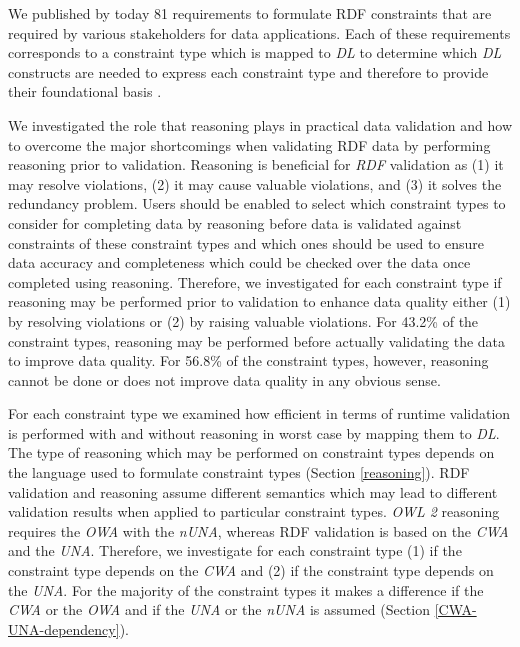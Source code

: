 \documentclass{acm_proc_article-sp}
\begin{document}
We published by today 81 requirements to formulate RDF constraints that are required by various stakeholders for data applications.
Each of these requirements corresponds to a constraint type which is mapped to \emph{DL}
to determine which \emph{DL} constructs are needed to express each constraint type
and therefore to provide their foundational basis \cite{BoschNolleAcarEckert2015}.

We investigated the role that reasoning plays in practical data validation and 
how to overcome the major shortcomings when validating RDF data by performing reasoning prior to validation.
Reasoning is beneficial for \emph{RDF} validation as 
(1) it may resolve violations, 
(2) it may cause valuable violations, and 
(3) it solves the redundancy problem.
Users should be enabled to select which constraint types to consider for completing data by reasoning before data is validated against constraints of these constraint types 
and which ones should be used to ensure data accuracy and completeness which could be checked over the data once completed using reasoning.
Therefore, we investigated for each constraint type if reasoning may be performed prior to validation to enhance data quality
either (1) by resolving violations or (2) by raising valuable violations.
For 43.2\% of the constraint types, reasoning may be performed before actually validating the data to improve data quality.
For 56.8\% of the constraint types, however, reasoning cannot be done or does not improve data quality in any obvious sense.

For each constraint type we examined how efficient in terms of runtime validation is performed with and without reasoning in worst case by mapping them to \emph{DL}.
The type of reasoning which may be performed on constraint types
depends on the language used to formulate constraint types (Section \ref{reasoning}).
RDF validation and reasoning assume different semantics which may lead to different validation results when applied to particular constraint types. %
\emph{OWL 2} reasoning requires the \emph{OWA} with the \emph{nUNA}, 
whereas RDF validation is based on the \emph{CWA} and the \emph{UNA}.
Therefore, we investigate for each constraint type
(1) if the constraint type depends on the \emph{CWA} and (2) if the constraint type depends on the \emph{UNA}.
For the majority of the constraint types it makes a difference if the \emph{CWA} or the \emph{OWA} and if the \emph{UNA} or the \emph{nUNA} is assumed (Section \ref{CWA-UNA-dependency}).
\end{document}
